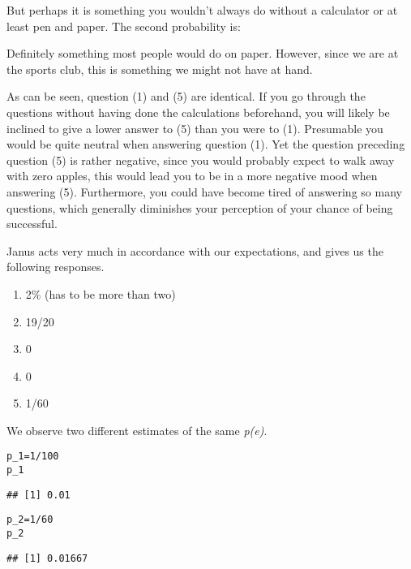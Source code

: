 \documentclass[a4paper]{book}\usepackage{graphicx, color}
\makeatletter
\newenvironment{kframe}{%
 \def\at@end@of@kframe{}%
 \ifinner\ifhmode%
  \def\at@end@of@kframe{\end{minipage}}%
  \begin{minipage}{\columnwidth}%
 \fi\fi%
 \def\FrameCommand##1{\hskip\@totalleftmargin \hskip-\fboxsep
 \colorbox{shadecolor}{##1}\hskip-\fboxsep
     \hskip-\linewidth \hskip-\@totalleftmargin \hskip\columnwidth}%
 \MakeFramed {\advance\hsize-\width
   \@totalleftmargin\z@ \linewidth\hsize
   \@setminipage}}%
 {\par\unskip\endMakeFramed%
 \at@end@of@kframe}
\newenvironment{knitrout}{}{} %
\makeatother
\begin{document}
But perhaps it is something you wouldn't always do without a calculator
or at least pen and paper. The second probability is:

Definitely something most people would do on paper. However, since we
are at the sports club, this is something we might not have at hand.

As can be seen, question (1) and (5) are identical. If you go through
the questions without having done the calculations beforehand, you will
likely be inclined to give a lower answer to (5) than you were to (1).
Presumable you would be quite neutral when answering question (1). Yet
the question preceding question (5) is rather negative, since you would
probably expect to walk away with zero apples, this would lead you to be
in a more negative mood when answering (5). Furthermore, you could have
become tired of answering so many questions, which generally diminishes
your perception of your chance of being successful.

Janus acts very much in accordance with our expectations, and gives us
the following responses.

\begin{enumerate}
\def\labelenumi{\arabic{enumi}.}
\itemsep1pt\parskip0pt
\item
  2\% (has to be more than two)
\item
  19/20
\item
  0
\item
  0
\item
  1/60
\end{enumerate}

We observe two different estimates of the same \emph{p(e)}.

\begin{knitrout}
\color{fgcolor}\begin{kframe}
\begin{alltt}
p_1 = 1/100
p_1
\end{alltt}
\begin{verbatim}
## [1] 0.01
\end{verbatim}
\end{kframe}
\end{knitrout}


\begin{knitrout}
\color{fgcolor}\begin{kframe}
\begin{alltt}
p_2 = 1/60
p_2
\end{alltt}
\begin{verbatim}
## [1] 0.01667
\end{verbatim}
\end{kframe}
\end{knitrout}
\end{document}
